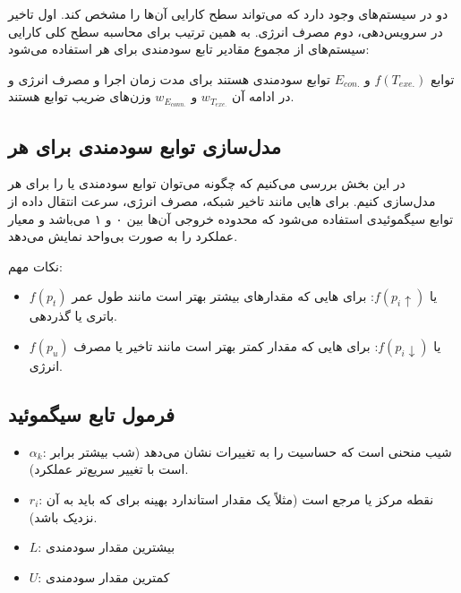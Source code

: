 \documentclass[a4paper]{article}
\begin{document}
دو  در سیستم‌های  وجود دارد که می‌تواند سطح کارایی آن‌ها را مشخص
کند. اول تاخیر در سرویس‌دهی، دوم مصرف انرژی. به همین ترتیب برای محاسبه سطح کلی
کارایی سیستم‌های  از مجموع مقادیر تابع سودمندی برای هر 
استفاده می‌شود:


توابع $f(T_{exe.})$ و $E_{con.}$ توابع سودمندی هستند برای مدت زمان اجرا و
مصرف انرژی و در ادامه آن $w_{T_{exe.}}$ و $w_{E_{conn.}}$ وزن‌های ضریب توابع
هستند.

\subsection{مدل‌سازی توابع سودمندی برای هر }

در این بخش بررسی می‌کنیم که چگونه می‌توان توابع سودمندی یا  را برای هر  مدل‌سازی کنیم. برای هایی مانند تاخیر
شبکه، مصرف انرژی، سرعت انتقال داده از توابع سیگموئیدی استفاده می‌شود که محدوده
خروجی آن‌ها بین ۰ و ۱ می‌باشد و معیار عملکرد  را به صورت بی‌واحد نمایش
می‌دهد.

نکات مهم:

\begin{itemize}
    \item $f(p_t)$ یا $f(p_i \uparrow)$: برای هایی که مقدار‌‌های بیشتر
    بهتر است مانند طول عمر باتری یا گذردهی.
    \item $f(p_u)$ یا $f(p_i \downarrow)$: برای هایی که مقدار کمتر بهتر
    است مانند تاخیر یا مصرف انرژی.
\end{itemize}

\subsection{فرمول تابع سیگموئید}


\begin{itemize}
    \item $\alpha_k$: شیب منحنی است که حساسیت را به تغییرات  نشان می‌دهد
    (شب بیشتر برابر است با تغییر سریع‌تر عملکرد).
    \item $r_i$: نقطه مرکز یا مرجع  است (مثلاً یک مقدار استاندارد بهینه
    برای  که  باید به آن نزدیک باشد).
    \item $L$: بیشترین مقدار سودمندی
    \item $U$: کمترین مقدار سودمندی
\end{itemize}
\end{document}
